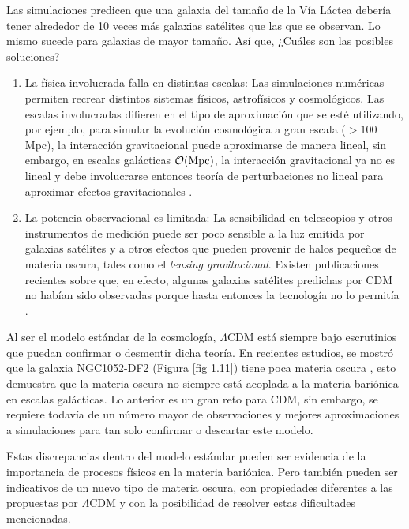 \documentclass[a4paper,openright,10pt, oneside, final]{book}
\begin{document}
Las simulaciones predicen que una galaxia del tamaño de la Vía Láctea debería tener alrededor de 10 veces más galaxias satélites que las que se observan. Lo mismo sucede para galaxias de mayor tamaño. Así que, ¿Cuáles son las posibles soluciones?
\begin{enumerate}
\item La física involucrada falla en distintas escalas: Las simulaciones numéricas permiten recrear distintos sistemas físicos, astrofísicos y cosmológicos. Las escalas involucradas difieren en el tipo de aproximación que se esté utilizando, por ejemplo, para simular la evolución cosmológica a gran escala ($>100$ Mpc), la interacción gravitacional puede aproximarse de manera lineal, sin embargo, en escalas galácticas $\mathcal{O}(\textup{Mpc})$, la interacción gravitacional ya no es lineal y  debe involucrarse entonces teoría de perturbaciones no lineal para aproximar efectos gravitacionales \cite{1.2.5}.

\item La potencia observacional es limitada: La sensibilidad en telescopios y otros instrumentos de medición puede ser poco sensible a la luz emitida por galaxias satélites y a otros efectos que pueden provenir de halos pequeños de materia oscura, tales como el \textit{lensing gravitacional}. Existen publicaciones recientes sobre que, en efecto, algunas galaxias satélites predichas por CDM no habían sido observadas porque hasta entonces la tecnología no lo permitía \cite{1.2.6}.
\end{enumerate}

Al ser el modelo estándar de la cosmología, $\Lambda$CDM está siempre bajo escrutinios que puedan confirmar o desmentir dicha teoría. En recientes estudios, se mostró que la galaxia NGC1052-DF2 (Figura \ref{fig 1.11}) tiene poca materia oscura \cite{1.2.6.1}, esto demuestra que la materia oscura no siempre está acoplada a la materia bariónica en escalas galácticas. Lo anterior es un gran reto para CDM, sin embargo, se requiere todavía de un número mayor de observaciones y mejores aproximaciones a simulaciones para tan solo confirmar o descartar este modelo.

Estas discrepancias dentro del modelo estándar pueden ser evidencia de la importancia de procesos físicos en la materia bariónica. Pero también pueden ser indicativos de un nuevo tipo de materia oscura, con propiedades diferentes a las propuestas por $\Lambda$CDM y con la posibilidad de resolver estas dificultades mencionadas.\\\\\\\\\\\\\\\\\\\\\\\\\\\\\\\
\end{document}
